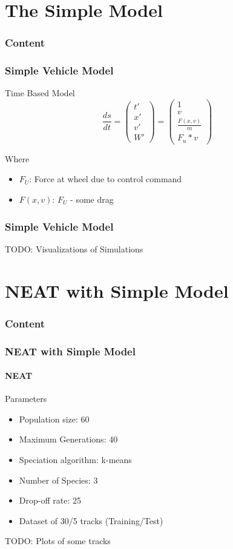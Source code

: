 \documentclass[8pt]{beamer}
\begin{document}
\section{The Simple Model}
\begin{frame}
	\frametitle{Content}
\end{frame}
\begin{frame}
	\frametitle{Simple Vehicle Model}
	\begin{block}{Time Based Model}	
	\[
	\frac{ds}{dt} = \left(
			\begin{array}{ll}
			t' \\
			x' \\
			v' \\
			W'
			\end{array}
		\right)
		= \left(
			\begin{array}{ll}
			1 \\
			v \\
			\frac{F(x,v)}{m} \\
			F_u * v
			\end{array}
		\right)
	\]
	
	Where\\
	\begin{itemize}
		\item $F_U$: Force at wheel due to control command
		\item $F(x,v)$: $F_U$ - some drag
	\end{itemize}
	\end{block}

\end{frame}

\begin{frame}
	\frametitle{Simple Vehicle Model}
	TODO: Visualizations of Simulations
\end{frame}


\section{NEAT with Simple Model}
\begin{frame}
	\frametitle{Content}
\end{frame}

\begin{frame}
	\frametitle{NEAT with Simple Model}
	\framesubtitle{NEAT}
	\begin{block}{Parameters}
		\begin{itemize}
			\item Population size: 60
			\item Maximum Generations: 40
			\item Speciation algorithm: k-means
			\item Number of Species: 3
			\item Drop-off rate: 25
			\item Dataset of 30/5 tracks (Training/Test)
		\end{itemize}
	\end{block}
	TODO: Plots of some tracks
\end{frame}
\end{document}
